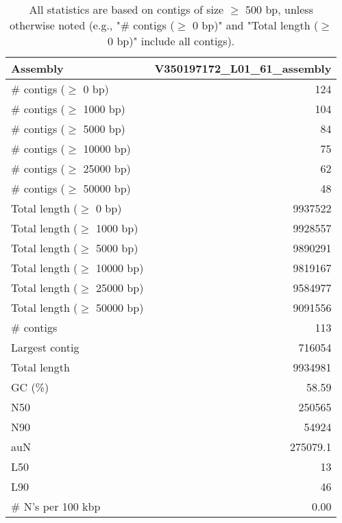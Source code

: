 \documentclass[12pt,a4paper]{article}
\begin{document}
\begin{table}[ht]
\begin{center}
\caption{All statistics are based on contigs of size $\geq$ 500 bp, unless otherwise noted (e.g., "\# contigs ($\geq$ 0 bp)" and "Total length ($\geq$ 0 bp)" include all contigs).}
\begin{tabular}{|l*{1}{|r}|}
\hline
Assembly & V350197172\_L01\_61\_assembly \\ \hline
\# contigs ($\geq$ 0 bp) & 124 \\ \hline
\# contigs ($\geq$ 1000 bp) & 104 \\ \hline
\# contigs ($\geq$ 5000 bp) & 84 \\ \hline
\# contigs ($\geq$ 10000 bp) & 75 \\ \hline
\# contigs ($\geq$ 25000 bp) & 62 \\ \hline
\# contigs ($\geq$ 50000 bp) & 48 \\ \hline
Total length ($\geq$ 0 bp) & 9937522 \\ \hline
Total length ($\geq$ 1000 bp) & 9928557 \\ \hline
Total length ($\geq$ 5000 bp) & 9890291 \\ \hline
Total length ($\geq$ 10000 bp) & 9819167 \\ \hline
Total length ($\geq$ 25000 bp) & 9584977 \\ \hline
Total length ($\geq$ 50000 bp) & 9091556 \\ \hline
\# contigs & 113 \\ \hline
Largest contig & 716054 \\ \hline
Total length & 9934981 \\ \hline
GC (\%) & 58.59 \\ \hline
N50 & 250565 \\ \hline
N90 & 54924 \\ \hline
auN & 275079.1 \\ \hline
L50 & 13 \\ \hline
L90 & 46 \\ \hline
\# N's per 100 kbp & 0.00 \\ \hline
\end{tabular}
\end{center}
\end{table}
\end{document}
